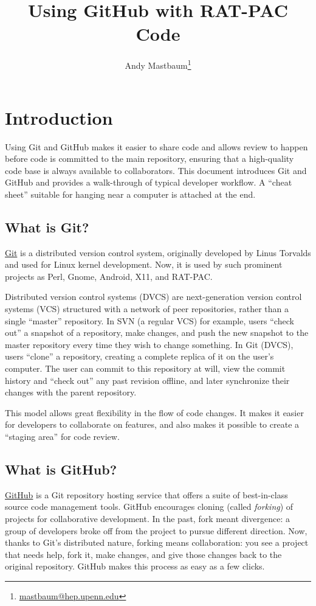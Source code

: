 \documentclass{article}
\title{Using GitHub with RAT-PAC Code}
\author{Andy Mastbaum\footnote{\href{mailto:mastbaum@hep.upenn.edu}{mastbaum@hep.upenn.edu}}}
\begin{document}
\maketitle
\tableofcontents
\section{Introduction}
Using Git and GitHub makes it easier to share code and allows review to happen
before code is committed to the main repository, ensuring that a high-quality
code base is always available to collaborators. This document introduces Git
and GitHub and provides a walk-through of typical developer workflow. A
``cheat sheet'' suitable for hanging near a computer is attached at the end.

\subsection{What is Git?}
\href{http://git-scm.com}{Git} is a distributed version control system,
originally developed by Linus Torvalds and used for Linux kernel development.
Now, it is used by such prominent projects as Perl, Gnome, Android, X11, and
RAT-PAC.

Distributed version control systems (DVCS) are next-generation version control
systems (VCS) structured with a network of peer repositories, rather than a
single ``master'' repository. In SVN (a regular VCS) for example, users
``check out'' a snapshot of a repository, make changes, and push the new
snapshot to the master repository every time they wish to change something.
In Git (DVCS), users ``clone'' a repository, creating a complete replica of it
on the user's computer. The user can commit to this repository at will, view
the commit history and ``check out'' any past revision offline, and later
synchronize their changes with the parent repository.

This model allows great flexibility in the flow of code changes. It makes it
easier for developers to collaborate on features, and also makes it possible
to create a ``staging area'' for code review.

\subsection{What is GitHub?}
\href{http://www.github.com}{GitHub} is a Git repository hosting service that
offers a suite of best-in-class source code management tools. GitHub
encourages cloning (called {\it forking}) of projects for collaborative
development.
In the past, fork meant divergence: a group of developers broke off from the
project to pursue different direction. Now, thanks to Git's distributed
nature, forking means collaboration: you see a project that needs help,
fork it, make changes, and give those changes back to the original repository.
GitHub makes this process as easy as a few clicks.
\end{document}
